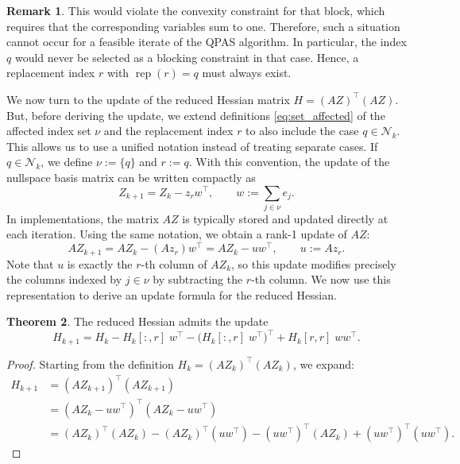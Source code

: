 \documentclass{book}
\theoremstyle{definition}
\newtheorem{theorem}{Theorem}[section]
\newtheorem{remark}[theorem]{Remark}
\newcounter{algorithm_}
\numberwithin{algorithm_}{chapter}
\begin{document}
{\begin{remark}
This would violate the convexity constraint for that block, which requires that the corresponding variables sum to one. Therefore, such a situation cannot occur for a feasible iterate of the QPAS algorithm. In particular, the index \(q\) would never be selected as a blocking constraint in that case. Hence, a replacement index \(r\) with \(\operatorname{rep}(r) = q\) must always exist.
\end{remark}

\bigskip

We now turn to the update of the reduced Hessian matrix $H = (AZ)^\top (AZ)$.
But, before deriving the update, we extend definitions \eqref{eq:set_affected} of the affected index set \(\nu\) and the replacement index \(r\) to also include the case \(q \in \mathcal{N}_k\). This allows us to use a unified notation instead of treating separate cases.
If \(q \in \mathcal{N}_k\), we define $\nu := \{q\}$ and $r := q$.
With this convention, the update of the nullspace basis matrix can be written compactly as
\begin{equation}  \label{eq:general_Z_update}
Z_{k+1} = Z_k - z_r w^\top,
\qquad
w := \sum_{j \in \nu} e_j.
\end{equation}
In implementations, the matrix \(AZ\) is typically stored and updated directly at each iteration. Using the same notation, we obtain a rank-1 update of \(AZ\):
\begin{equation} \label{eq:AZ_update}
AZ_{k+1} = AZ_k - (A z_r) w^\top = AZ_k - u w^\top,
\qquad
u := A z_r.
\end{equation}
Note that \(u\) is exactly the \(r\)-th column of \(AZ_k\), so this update modifies precisely the columns indexed by \(j \in \nu\) by subtracting the \(r\)-th column. We now use this representation to derive an update formula for the reduced Hessian.

\begin{theorem}
\label{thm:hessian-update}
The reduced Hessian admits the update
\begin{equation}
H_{k+1}
=
H_k
-
H_k[:,r] \; w^\top
-
\bigl(H_k[:,r] \; w^\top\bigr)^\top
+
H_k[r,r]\; w w^\top.
\end{equation}

\begin{proof}
Starting from the definition \(H_k = (AZ_k)^\top (AZ_k)\), we expand:
\begin{align}
H_{k+1}
&= (AZ_{k+1})^\top (AZ_{k+1}) \\
&= (AZ_k - u w^\top)^\top (AZ_k - u w^\top) \\
&= (AZ_k)^\top (AZ_k)
- (AZ_k)^\top (u w^\top)
- (u w^\top)^\top (AZ_k)
+ (u w^\top)^\top (u w^\top).
\end{align}


\end{proof}
\end{theorem}}
\end{document}
